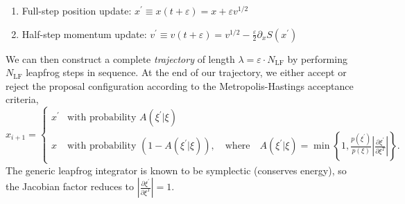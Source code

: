 \documentclass{article} %
\begin{document}
{\begin{enumerate}
   \item Full-step position update: \hspace{36pt}\(%
      x^{\prime} \equiv x(t+\varepsilon) = x + \varepsilon v^{1/2}
   \)
   \item Half-step momentum update:
      \hspace{18pt} \(%
         v^{\prime} \equiv v(t+\varepsilon) = v^{1/2} - \frac{\varepsilon}{2}\partial_{x} S(x^{\prime})
   \)
\end{enumerate}
%
We can then construct a complete \emph{trajectory} of length \(\lambda = \varepsilon\cdot N_{\mathrm{LF}}\) by
performing \(N_{\mathrm{LF}}\) leapfrog steps in sequence.
%
At the end of our trajectory, we either accept or reject the proposal configuration according to the Metropolis-Hastings
acceptance criteria,
%
\begin{equation}
   x_{i+1} =
   \begin{cases}%
      x^{\prime} &\mbox{with probability } A(\xi^{\prime}|\xi) \\
      x &\mbox{with probability } (1 - A(\xi^{\prime}|\xi)), \quad\text{where}\quad %
         A(\xi^{\prime}|\xi) = \min\left\{%
            1, \frac{p(\xi^{\prime})}{p(\xi)}\left|\frac{\partial{\xi^{\prime}}}{\partial\xi^{T}}\right|%
         \right\}.
   \end{cases}
   \label{eq:mhcriteria}
\end{equation}
%
%
The generic leapfrog integrator is known to be symplectic (conserves energy), so the Jacobian factor reduces to
\(\left|\frac{\partial\xi^{\prime}}{\partial\xi^{T}}\right| = 1\). 
%

}
\end{document}
